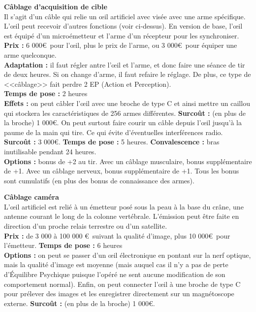 \documentclass[11pt,twoside,a4paper]{article}
\begin{document}
\begin{multicols*}{2}
\textbf{C{\^a}blage d'acquisition de cible}~\\
Il s'agit d'un c{\^a}ble qui relie un \oe il artificiel avec vis{\'e}e avec une arme sp{\'e}cifique. L'\oe il peut recevoir d'autres fonctions (voir ci-dessus). En version de base, l'\oe il est {\'e}quip{\'e} d'un micro{\'e}metteur et l'arme d'un r{\'e}cepteur pour les synchroniser. ~\\
{\small 
	\textbf{Prix : }6 000\euro ~pour l'\oe il, plus le prix de l'arme, ou 3 000\euro ~pour {\'e}quiper une arme quelconque. ~\\
	\textbf{Adaptation : }il faut r{\'e}gler antre l'\oe il et l'arme, et donc faire une s{\'e}ance de tir de deux heures. Si on change d'arme, il faut refaire le r{\'e}glage. De plus, ce type de <<c{\^a}blage>> fait perdre 2 EP (Action et Perception). ~\\
	\textbf{Temps de pose : }2 heures~\\
	\textbf{Effets : }on peut c{\^a}bler l'\oe il avec une broche de type C et ainsi mettre un caillou qui stockera les caract{\'e}ristiques de 256 armes diff{\'e}rentes. \textbf{Surco{\^u}t : }(en plus de la broche) 1 000\euro . On peut surtout faire courir un c{\^a}ble depuis l'\oe il jusqu'{\`a} la paume de la main qui tire. Ce qui {\'e}vite d'{\'e}ventuelles interf{\'e}rences radio. \textbf{Surco{\^u}t : }3 000\euro . \textbf{Temps de pose : }5 heures. \textbf{Convalescence : }bras inutilisable pendant 24 heures. ~\\
	\textbf{Options : }bonus de +2 au tir. Avec un c{\^a}blage musculaire, bonus suppl{\'e}mentaire de +1. Avec un c{\^a}blage nerveux, bonus suppl{\'e}mentaire de +1. Tous les bonus sont cumulatifs (en plus des bonus de connaissance des armes). ~\\
} %

\textbf{C{\^a}blage cam{\'e}ra}~\\
L'\oe il artificiel est reli{\'e} {\`a} un {\'e}metteur pos{\'e} sous la peau {\`a} la base du cr{\^a}ne, une antenne courant le long de la colonne vert{\'e}brale. L'{\'e}mission peut {\^e}tre faite en direction d'un proche relais terrestre ou d'un satellite. ~\\
{\small 
	\textbf{Prix : }de 3 000 {\`a} 100 000 \euro ~suivant la qualit{\'e} d'image, plus 10 000\euro ~pour l'{\'e}metteur. %
	\textbf{Temps de pose : }6 heures~\\
	\textbf{Options : }on peut se passer d'un \oe il {\'e}lectronique en pontant sur la nerf optique, mais la qualit{\'e} d'image est moyenne (mais auquel cas il n'y a pas de perte d'{\'E}quilibre Psychique puisque l'op{\'e}r{\'e} ne sent aucune modification de son comportement normal). Enfin, on peut connecter l'\oe il {\`a} une broche de type C pour pr{\'e}lever des images et les enregistrer directement sur un magn{\'e}toscope externe. \textbf{Surco{\^u}t : }(en plus de la broche) 1 000\euro . ~\\
} %


\end{multicols*}
\end{document}
